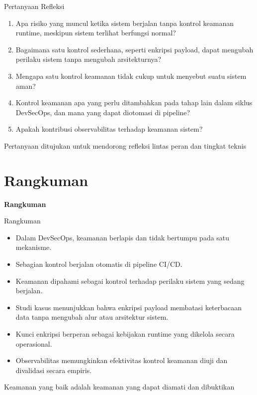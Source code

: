 \documentclass[aspectratio=169, table]{beamer}
\begin{document}
\begin{frame}{Pertanyaan Refleksi}
	\vspace{10pt}
	\begin{enumerate}
		\item Apa risiko yang muncul ketika sistem berjalan tanpa kontrol keamanan runtime,
		      meskipun sistem terlihat berfungsi normal?
		\item Bagaimana satu kontrol sederhana, seperti enkripsi payload,
		      dapat mengubah perilaku sistem tanpa mengubah arsitekturnya?
		\item Mengapa satu kontrol keamanan tidak cukup untuk menyebut suatu sistem aman?
		\item Kontrol keamanan apa yang perlu ditambahkan pada tahap lain dalam siklus DevSecOps,
		      dan mana yang dapat diotomasi di pipeline?
		\item Apakah kontribusi observabilitas terhadap keamanan sistem?
	\end{enumerate}
	
	\vspace{6pt}
	{\footnotesize Pertanyaan ditujukan untuk mendorong refleksi lintas peran dan tingkat teknis}
\end{frame}


\section{Rangkuman}

	\begin{frame}{\hfill}
		\centering
		\Huge{\textbf{Rangkuman}}
	\end{frame}

\begin{frame}{Rangkuman}
	\vspace{10pt}
	\begin{itemize}
		\item Dalam DevSecOps, keamanan berlapis dan tidak bertumpu pada satu mekanisme.
		\item Sebagian kontrol berjalan otomatis di pipeline CI/CD.
		\item Keamanan dipahami sebagai kontrol terhadap perilaku sistem yang sedang berjalan.
		\item Studi kasus menunjukkan bahwa enkripsi payload membatasi keterbacaan data
		      tanpa mengubah alur atau arsitektur sistem.
		\item Kunci enkripsi berperan sebagai kebijakan runtime yang dikelola secara operasional.
		\item Observabilitas memungkinkan efektivitas kontrol keamanan diuji dan divalidasi secara empiris.
	\end{itemize}
	
	\vspace{6pt}
	{\footnotesize Keamanan yang baik adalah keamanan yang dapat diamati dan dibuktikan}
\end{frame}
\end{document}
